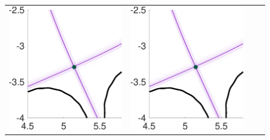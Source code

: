 \documentclass{beamer}
\begin{document}
\begin{frame}[t]
\begin{itemize}[leftmargin=5pt]
\begin{figure}[ht!]
{\begin{tabular}{cccc}
\includegraphics[width=1\linewidth]{./figures_slides/QoI_MC_uniform_xptRegion.pdf} 
&\includegraphics[width=1\linewidth]{./figures_slides/QoI_MLMC_DirectSolver_xptRegion_Interp2CommonGrid.pdf} 

\end{tabular}}
\end{figure}
\end{itemize}
\end{frame}
\end{document}
